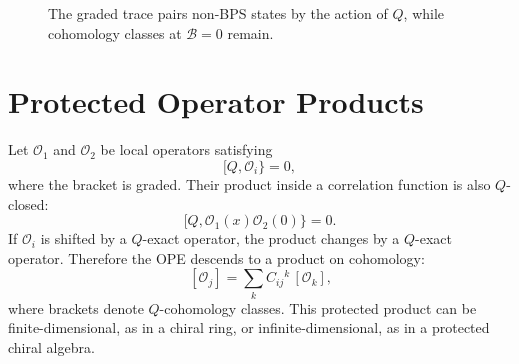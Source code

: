 \begin{figure}[H]
  \centering
  \caption{The graded trace pairs non-BPS states by the action of \(Q\), while
  cohomology classes at \(\mathcal B=0\) remain.}
  \label{fig:index-pairing-cancellation}
\end{figure}

\section{Protected Operator Products}

Let \(\mathcal O_1\) and \(\mathcal O_2\) be local operators satisfying
\[
  [Q,\mathcal O_i\}=0,
\]
where the bracket is graded.  Their product inside a correlation function is
also \(Q\)-closed:
\[
  [Q,\mathcal O_1(x)\mathcal O_2(0)\}=0.
\]
If \(\mathcal O_i\) is shifted by a \(Q\)-exact operator, the product changes
by a \(Q\)-exact operator.  Therefore the OPE descends to a product on
cohomology:
\begin{equation}
  [\mathcal O_i]\,[\mathcal O_j]
  =
  \sum_k C_{ij}{}^k\,[\mathcal O_k],
  \label{eq:protected-ope-cohomology-product}
\end{equation}
where brackets denote \(Q\)-cohomology classes.  This protected product can
be finite-dimensional, as in a chiral ring, or infinite-dimensional, as in a
protected chiral algebra.

